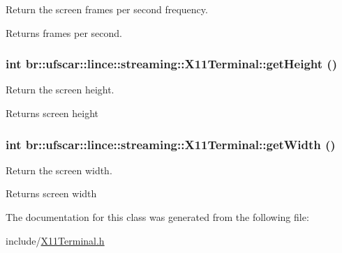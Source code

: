 Return the screen frames per second frequency. 

\begin{DoxyReturn}{Returns}
frames per second. 
\end{DoxyReturn}
\hypertarget{classbr_1_1ufscar_1_1lince_1_1streaming_1_1X11Terminal_a5e2a1b9e3318b58b9d2c7b44dba5757e}{
\subsubsection[{getHeight}]{\setlength{\rightskip}{0pt plus 5cm}int br::ufscar::lince::streaming::X11Terminal::getHeight ()}}
\label{classbr_1_1ufscar_1_1lince_1_1streaming_1_1X11Terminal_a5e2a1b9e3318b58b9d2c7b44dba5757e}


Return the screen height. 

\begin{DoxyReturn}{Returns}
screen height 
\end{DoxyReturn}
\hypertarget{classbr_1_1ufscar_1_1lince_1_1streaming_1_1X11Terminal_a97415fbf1c4a44664ba8d810ce77bf93}{
\subsubsection[{getWidth}]{\setlength{\rightskip}{0pt plus 5cm}int br::ufscar::lince::streaming::X11Terminal::getWidth ()}}
\label{classbr_1_1ufscar_1_1lince_1_1streaming_1_1X11Terminal_a97415fbf1c4a44664ba8d810ce77bf93}


Return the screen width. 

\begin{DoxyReturn}{Returns}
screen width 
\end{DoxyReturn}


The documentation for this class was generated from the following file:\begin{DoxyCompactItemize}
\item 
include/\hyperlink{X11Terminal_8h}{X11Terminal.h}\end{DoxyCompactItemize}
